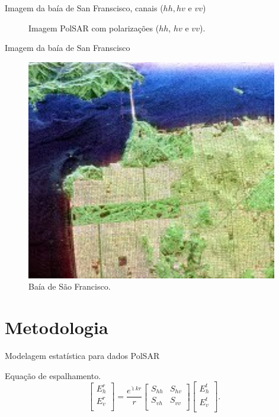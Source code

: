 \documentclass[10pt]{beamer}
\begin{document}
\begin{frame}{Imagem da baía de San Franscisco, canais ($hh, hv$ e $vv$)}
\begin{figure}[hbt]
\endminipage
	\caption{Imagem PolSAR com polarizações ($hh$, $hv$ e $vv$).}\label{cap_acf_sf_hh_hv_vv}
\end{figure}
\end{frame}

\begin{frame}{Imagem da baía de San Franscisco}
\begin{figure}[hbt]
\includegraphics[scale=0.85]{polsar_teste.pdf}
\caption{Baía de São Francisco.}
\label{cap_acf_sf_pauli}
\end{figure}
\end{frame}

\section{Metodologia}
\begin{frame}{Modelagem estatística para dados PolSAR}
	
\begin{alertblock}{Equação de espalhamento.}
\begin{equation}\label{cap_acf_1}
 \left[
\begin{array}{c}
	E_{h}^{r}   \\
	E_{v}^{r}    \\
\end{array}
\right]
 = \frac{e^{\hat{\imath} kr}}{r}\left[
\begin{array}{cc}
	S_{hh}   & S_{hv}   \\
	S_{vh}   & S_{vv}   \\
\end{array}
\right]
 \left[
\begin{array}{c}
	E_{h}^{t}   \\
	E_{v}^{t}    \\
\end{array}
\right].
\end{equation}
\end{alertblock}
\end{frame}
\end{document}
